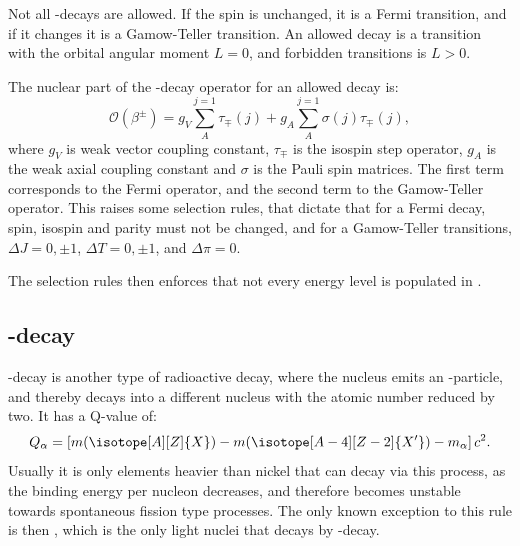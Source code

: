 Not all \be-decays are allowed. If the spin is unchanged, it is a Fermi transition, and if it changes it is a Gamow-Teller transition. 
An allowed decay is a transition with the orbital angular moment $L = 0$, and forbidden transitions is $L > 0$.

The nuclear part of the \be-decay operator for an allowed decay is:
\begin{equation}
	\mathcal{O} (\beta^\pm) = g_V \sum_{A}^{j=1}\tau_\mp (j) + g_A \sum_{A}^{j=1}\sigma(j)\tau_\mp(j),
\end{equation}
where $g_V$ is weak vector coupling constant, $\tau_\mp$ is the isospin step operator, $g_A$ is the weak axial coupling constant and $\sigma$ is the Pauli spin matrices.
The first term corresponds to the Fermi operator, and the second term to the Gamow-Teller operator. 
This raises some selection rules, that dictate that for a Fermi decay, spin, isospin and parity must not be changed, and for a Gamow-Teller transitions, $\Delta J = 0, \pm1$, $\Delta T = 0, \pm 1$, and $\Delta \pi = 0$.

The selection rules then enforces that not every energy level is populated in \ber. 

\subsection{\al-decay}
\al-decay is another type of radioactive decay, where the nucleus emits an \al-particle, and thereby decays into a different nucleus with the atomic number reduced by two.  
It has a Q-value of:
\begin{equation}
Q_\alpha =  \left[ m (\isotope[A][Z]{X}) - m(\isotope[A-4][Z-2]{X'})  	- m_\alpha	 \right] c^2.
\end{equation}
Usually it is only elements heavier than nickel that can decay via this process, as the binding energy per nucleon decreases, and therefore becomes unstable towards spontaneous fission type processes. The only known exception to this rule is then \ber, which is the only light nuclei that decays by \al-decay. 

